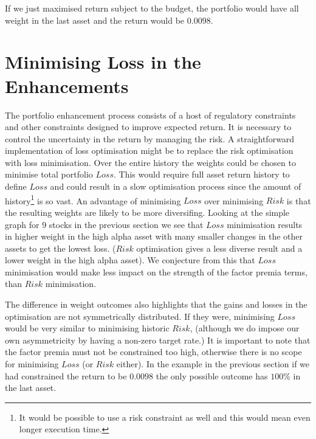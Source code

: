 \documentclass[12pt]{article}
\begin{document}
\break
\break
{}
\break
If we just maximised return subject to the budget, the portfolio would have all weight in the last 
asset and the return would be $0.0098$.

\section{Minimising Loss in the Enhancements}
The portfolio enhancement process consists of a host of regulatory constraints and other constraints 
designed to improve expected return. It is necessary to control the uncertainty in the return by 
managing the risk.
A straightforward 
implementation of loss optimisation might be to replace the risk optimisation with loss minimisation.
Over the entire history the weights could be chosen to minimise total portfolio $Loss$.
This would require full asset return history to define $Loss$ and could 
result in a slow optimisation process since the amount of history\footnote{It would be possible 
to use a risk constraint as well and this would mean even longer execution time.} is so vast.  An advantage of
minimising $Loss$ over minimising $Risk$ is that the resulting weights are likely
to be more diversifing. Looking at the simple graph for 9 stocks in the previous section we see that
$Loss$ minimisation results in higher weight in the high alpha asset with many 
smaller changes in the other assets to get the lowest loss. ($Risk$ optimisation gives a less diverse
result and a lower weight in the high alpha asset). We conjecture from this that $Loss$ minimisation 
would make less impact on the strength of the factor premia terms, than $Risk$ minimisation. 

The difference in weight outcomes also
highlights that the gains and losses in the optimisation are not symmetrically
distributed. If they were, minimising $Loss$ would be very similar to minimising historic $Risk$, (although
we do impose our own asymmetricity by having a non-zero target rate.) It is important
to note that the factor premia must not be constrained too high, otherwise there is no scope 
for minimising $Loss$ (or $Risk$ either). In the example in the previous section 
if we had constrained the return to be $0.0098$ the only possible outcome has $100\%$ in 
the last asset.
\end{document}
